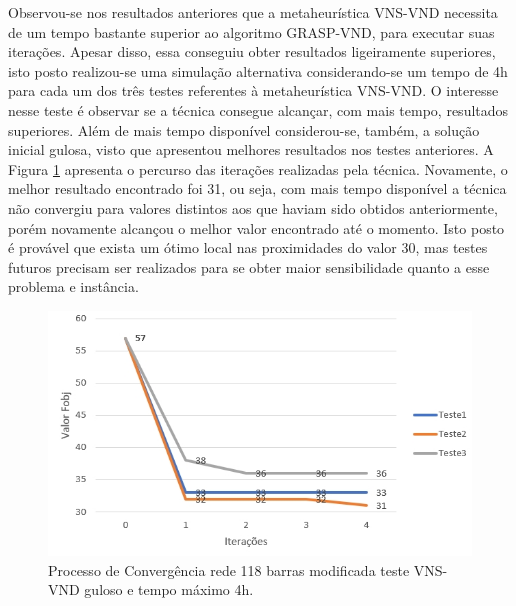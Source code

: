 \documentclass[12pt]{article}
\begin{document}
Observou-se nos resultados anteriores que a metaheurística VNS-VND necessita de um tempo bastante superior ao algoritmo GRASP-VND, para executar suas iterações. Apesar disso, essa conseguiu obter resultados ligeiramente superiores, isto posto realizou-se uma simulação alternativa considerando-se um tempo de 4h para cada um dos três testes referentes à metaheurística VNS-VND. O interesse nesse teste é observar se a técnica consegue alcançar, com mais tempo, resultados superiores. Além de mais tempo disponível considerou-se, também, a solução inicial gulosa, visto que apresentou melhores resultados nos testes anteriores. A Figura \ref{fig18} apresenta o percurso das iterações realizadas pela técnica. Novamente, o melhor resultado encontrado foi 31, ou seja, com mais tempo disponível a técnica não convergiu para valores distintos aos que haviam sido obtidos anteriormente, porém novamente alcançou o melhor valor encontrado até o momento. Isto posto é provável que exista um ótimo local nas proximidades do valor 30, mas testes futuros precisam ser realizados para se obter maior sensibilidade quanto a esse problema e instância.


\begin{figure}[H]
	\centering 
	\includegraphics[scale=0.75]{figuras/VNS_VND_118Guloso_4h.jpg}
	\caption{Processo de Convergência rede 118 barras modificada teste VNS-VND guloso e tempo máximo 4h.}
	\label{fig18} %
\end{figure}
\end{document}
